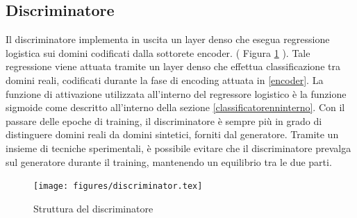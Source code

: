 \subsection{Discriminatore}
\label{discriminator}
Il discriminatore implementa in uscita un layer denso che esegua regressione logistica sui domini codificati dalla sottorete encoder. ( Figura \ref{fig:discriminator} ). Tale regressione viene attuata tramite un layer denso che effettua classificazione tra domini reali, codificati durante la fase di encoding attuata in \ref{encoder}. La funzione di attivazione utilizzata all'interno del regressore logistico è la funzione sigmoide come descritto all'interno della sezione \ref{classificatorenninterno}. Con il passare delle epoche di training, il discriminatore è sempre più in grado di distinguere domini reali da domini sintetici, forniti dal generatore. Tramite un insieme di tecniche sperimentali, è possibile evitare che il discriminatore prevalga sul generatore durante il training, mantenendo un equilibrio tra le due parti.

\begin{figure}[p]
    \centering
	\texttt{[image: figures/discriminator.tex]}
	\caption{Struttura del discriminatore}
\label{fig:discriminator}
\end{figure}



